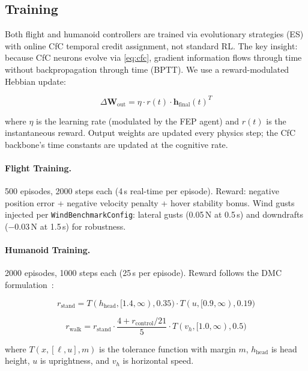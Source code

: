 \documentclass[11pt,twocolumn]{article}
\begin{document}
\subsection{Training}
\label{sec:training}

Both flight and humanoid controllers are trained via evolutionary strategies (ES) with online CfC temporal credit assignment, not standard RL. The key insight: because CfC neurons evolve via \cref{eq:cfc}, gradient information flows through time without backpropagation through time (BPTT). We use a reward-modulated Hebbian update:

\begin{equation}
\Delta \mathbf{W}_{\text{out}} = \eta \cdot r(t) \cdot \mathbf{h}_{\text{final}}(t)^T
\end{equation}

where $\eta$ is the learning rate (modulated by the FEP agent) and $r(t)$ is the instantaneous reward. Output weights are updated every physics step; the CfC backbone's time constants are updated at the cognitive rate.

\paragraph{Flight Training.} 500 episodes, 2000 steps each (4\,s real-time per episode). Reward: negative position error + negative velocity penalty + hover stability bonus. Wind gusts injected per \texttt{WindBenchmarkConfig}: lateral gusts (0.05\,N at 0.5\,s) and downdrafts ($-0.03$\,N at 1.5\,s) for robustness.

\paragraph{Humanoid Training.} 2000 episodes, 1000 steps each (25\,s per episode). Reward follows the DMC formulation~\cite{tassa2018deepmind}:

\begin{equation}
r_{\text{stand}} = T(h_{\text{head}}, [1.4, \infty), 0.35) \cdot T(u, [0.9, \infty), 0.19)
\end{equation}

\begin{equation}
r_{\text{walk}} = r_{\text{stand}} \cdot \frac{4 + r_{\text{control}}/21}{5} \cdot T(v_h, [1.0, \infty), 0.5)
\end{equation}

where $T(x, [\ell, u], m)$ is the tolerance function with margin $m$, $h_{\text{head}}$ is head height, $u$ is uprightness, and $v_h$ is horizontal speed.
\end{document}
